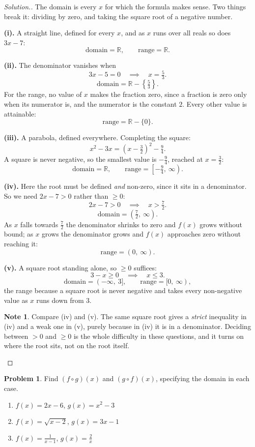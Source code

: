 \documentclass[11pt,a4paper]{article}
\theoremstyle{definition}
\newtheorem{note}[thm]{Note}
\newtheorem{problemx}{Problem}[section]
\newenvironment{problem}{\begin{problemx}}{\end{problemx}}
\newenvironment{solution}
  {\renewcommand{\qedsymbol}{}\begin{proof}[\textit{Solution}.]}
  {\end{proof}}
\begin{document}
\begin{solution}
The domain is every $x$ for which the formula makes sense. Two things break it:
dividing by zero, and taking the square root of a negative number.

\textbf{(i).} A straight line, defined for every $x$, and as $x$ runs over all reals so
does $3x-7$:
$$\text{domain}=\mathbb{R},\qquad \text{range}=\mathbb{R}.$$

\textbf{(ii).} The denominator vanishes when
$$3x-5=0\quad\implies\quad x=\tfrac{5}{3}.$$
$$\text{domain}=\mathbb{R}-\left\{\tfrac{5}{3}\right\}.$$
For the range, no value of $x$ makes the fraction zero, since a fraction is zero only
when its numerator is, and the numerator is the constant $2$. Every other value is
attainable:
$$\text{range}=\mathbb{R}-\{0\}.$$

\textbf{(iii).} A parabola, defined everywhere. Completing the square:
$$x^2-3x=\left(x-\tfrac{3}{2}\right)^2-\tfrac{9}{4}.$$
A square is never negative, so the smallest value is $-\frac{9}{4}$, reached at
$x=\frac{3}{2}$:
$$\text{domain}=\mathbb{R},\qquad \text{range}=\left[-\tfrac{9}{4},\ \infty\right).$$

\textbf{(iv).} Here the root must be defined \emph{and} non-zero, since it sits in a
denominator. So we need $2x-7>0$ rather than $\geq 0$:
$$2x-7>0\quad\implies\quad x>\tfrac{7}{2}.$$
$$\text{domain}=\left(\tfrac{7}{2},\ \infty\right).$$
As $x$ falls towards $\frac{7}{2}$ the denominator shrinks to zero and $f(x)$ grows
without bound; as $x$ grows the denominator grows and $f(x)$ approaches zero without
reaching it:
$$\text{range}=(0,\ \infty).$$

\textbf{(v).} A square root standing alone, so $\geq 0$ suffices:
$$3-x\geq 0\quad\implies\quad x\leq 3.$$
$$\text{domain}=(-\infty,\ 3],\qquad \text{range}=[0,\ \infty),$$
the range because a square root is never negative and takes every non-negative value as
$x$ runs down from $3$.

\begin{note}
Compare (iv) and (v). The same square root gives a \emph{strict} inequality in (iv) and
a weak one in (v), purely because in (iv) it is in a denominator. Deciding between
$>0$ and $\geq 0$ is the whole difficulty in these questions, and it turns on where the
root sits, not on the root itself.
\end{note}
\end{solution}

\begin{problem}
Find $(f\circ g)(x)$ and $(g\circ f)(x)$, specifying the domain in each case.
\begin{enumerate}
\item[(i).] $f(x)=2x-6$, \quad $g(x)=x^2-3$
\item[(ii).] $f(x)=\sqrt{x-2}$, \quad $g(x)=3x-1$
\item[(iii).] $f(x)=\frac{1}{x-1}$, \quad $g(x)=\frac{2}{x}$
\end{enumerate}
\end{problem}
\end{document}
